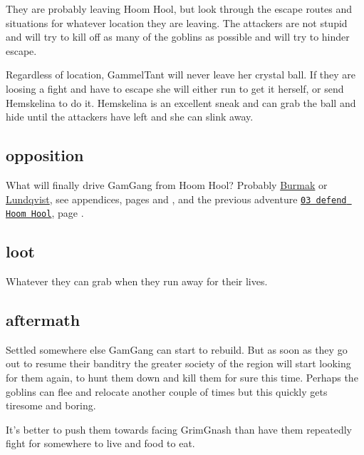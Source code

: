 They are probably leaving Hoom Hool, but look through the escape routes and situations for whatever location they are leaving. The attackers are not stupid and will try to kill off as many of the goblins as possible and will try to hinder escape.

Regardless of location, GammelTant will never leave her crystal ball. If they are loosing a fight and have to escape she will either run to get it herself, or send Hemskelina to do it. Hemskelina is an excellent sneak and can grab the ball and hide until the attackers have left and she can slink away.


\subsection*{opposition}

What will finally drive GamGang from Hoom Hool? Probably \hyperref[appendixburmak]{Burmak} or \hyperref[appendixlundqvist]{Lundqvist}, see appendices, pages \pageref{appendixburmak} and \pageref{appendixlundqvist}, and the previous adventure \hyperref[03defendhoomhool]{\texttt{03 defend Hoom Hool}}, page \pageref{03defendhoomhool}.


\subsection*{loot}

Whatever they can grab when they run away for their lives.


\subsection*{aftermath}

Settled somewhere else GamGang can start to rebuild. But as soon as they go out to resume their banditry the greater society of the region will start looking for them again, to hunt them down and kill them for sure this time. Perhaps the goblins can flee and relocate another couple of times but this quickly gets tiresome and boring.

It's better to push them towards facing GrimGnash than have them repeatedly fight for somewhere to live and food to eat.













\clearpage
